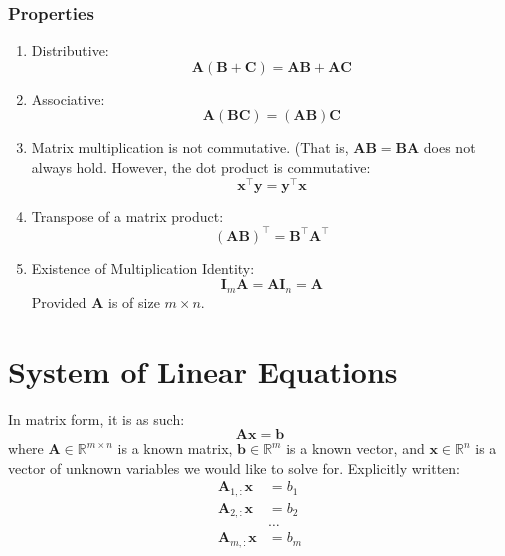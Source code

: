 \documentclass[11pt,twocolumn]{report}
\def\realnumbers{\mathbb{R}}
\begin{document}
\subsubsection{Properties}
\begin{enumerate}
  \item Distributive: 
    \begin{equation}
      \bm{A}(\bm{B} + \bm{C}) = \bm{AB} + \bm{AC}
    \end{equation}
  \item Associative:
    \begin{equation}
      \bm{A}(\bm{BC}) = (\bm{AB})\bm{C}
    \end{equation}
  \item Matrix multiplication is not commutative. (That is, $\bm{AB} = \bm{BA}$
    does not always hold. However, the dot product is commutative:
    \begin{equation}
      \bm{x}^\intercal\bm{y} = \bm{y}^\intercal\bm{x}
    \end{equation}
  \item Transpose of a matrix product:
    \begin{equation}
      (\bm{AB})^\intercal = \bm{B}^\intercal\bm{A}^\intercal
    \end{equation}
  \item Existence of Multiplication Identity:
    \begin{equation}
      \bm{I}_m\bm{A} = \bm{A}\bm{I}_n = \bm{A}
    \end{equation}
    Provided $\bm{A}$ is of size $m \times n$.
\end{enumerate}

\section{System of Linear Equations}
In matrix form, it is as such:
\begin{equation}
  \label{linear_equation}
  \bm{Ax} = \bm{b}
\end{equation}
where $\bm{A} \in \realnumbers^{m \times n}$ is a known matrix, $\bm{b} \in
\realnumbers^m$ is a known vector, and $\bm{x} \in \realnumbers^n$ is a vector
of unknown variables we would like to solve for. Explicitly written:
\begin{align}
  \bm{A}_{1, :}\bm{x} & = b_1\\
  \bm{A}_{2, :}\bm{x} & = b_2\\
  & \hdots\\
  \bm{A}_{m, :}\bm{x} & = b_m
\end{align}
\end{document}
